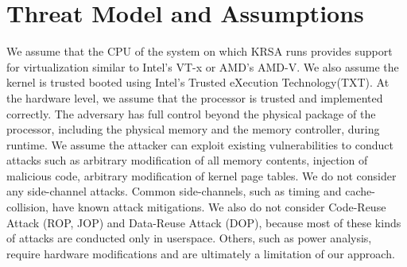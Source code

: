 \documentclass[conference]{IEEEtran}
\begin{document}
\section{Threat Model and Assumptions}
We assume that the CPU of the system on which KRSA runs provides support for virtualization similar to Intel's VT-x or AMD's AMD-V. We also assume the kernel is trusted booted using Intel's Trusted eXecution Technology(TXT). At the hardware level, we assume that the processor is trusted and implemented correctly. The adversary has full control beyond the physical package of the processor, including the physical memory and the memory controller, during runtime. We assume the attacker can exploit existing vulnerabilities to conduct attacks such as arbitrary modification of all memory contents, injection of malicious code, arbitrary modification of kernel page tables. 
We do not consider any side-channel attacks. Common side-channels, such as timing and cache-collision, have known attack mitigations\cite{sideattack,sideservey18}. We also do not consider Code-Reuse Attack (ROP\cite{rop},
JOP\cite{jop}) and Data-Reuse Attack (DOP\cite{dop}), because most of these kinds of attacks are conducted only in userspace. Others, such as power analysis, require hardware modifications and are ultimately a limitation of our approach. 
\end{document}

